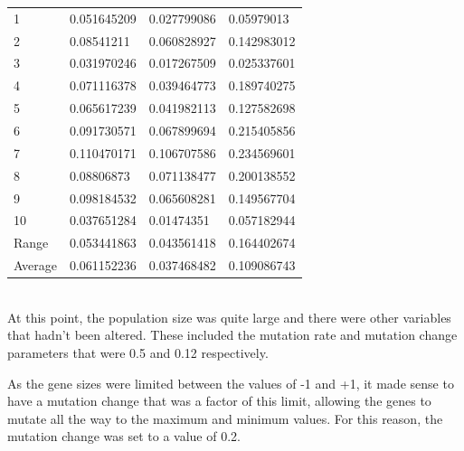 \documentclass[sigconf]{acmart}
\begin{document}
%
%
\begin{supertabular}{@{}p{0.1\columnwidth}p{0.25\columnwidth}p{0.25\columnwidth}p{0.25\columnwidth}}
    1&0.051645209&0.027799086&0.05979013\\
    2&0.08541211&0.060828927&0.142983012\\
    3&0.031970246&0.017267509&0.025337601\\
    4&0.071116378&0.039464773&0.189740275\\
    5&0.065617239&0.041982113&0.127582698\\
    6&0.091730571&0.067899694&0.215405856\\
    7&0.110470171&0.106707586&0.234569601\\
    8&0.08806873&0.071138477&0.200138552\\
    9&0.098184532&0.065608281&0.149567704\\
    10&0.037651284&0.01474351&0.057182944\\
    Range&0.053441863&0.043561418&0.164402674\\
    Average&0.061152236&0.037468482&0.109086743\\
    
\end{supertabular}%
\\

At this point, the population size was quite large and there were other variables that hadn't been altered. These included the mutation rate and mutation change parameters that were 0.5 and 0.12 respectively.

As the gene sizes were limited between the values of -1 and +1, it made sense to have a mutation change that was a factor of this limit, allowing the genes to mutate all the way to the maximum and minimum values. For this reason, the mutation change was set to a value of 0.2.
\end{document}
